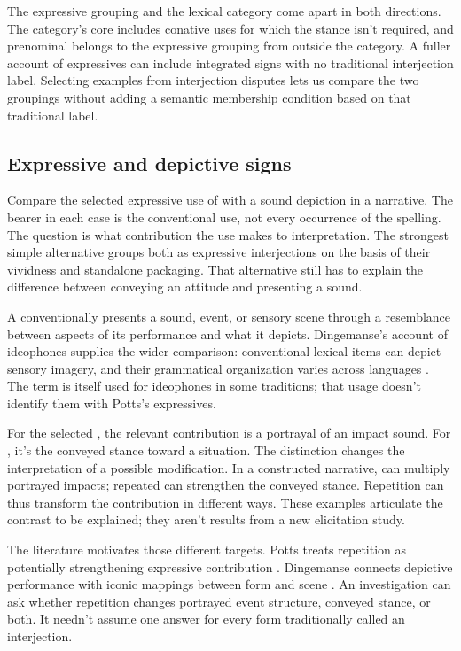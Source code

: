 \documentclass[12pt]{article}
\begin{document}
The expressive grouping and the lexical category come apart in both
directions. The category's core includes conative uses for which the stance
isn't required, and prenominal  belongs to the expressive
grouping from outside the category. A fuller account of expressives can include integrated signs
with no traditional interjection label. Selecting examples from interjection
disputes lets us compare the two groupings without adding a semantic
membership condition based on that traditional label.

\subsection{Expressive and depictive signs}\label{sec:expressive-depictive}

Compare the selected expressive use of  with a sound depiction
 in a narrative. The bearer in each case is the conventional
use, not every occurrence of the spelling. The question is what contribution
the use makes to interpretation. The strongest simple alternative groups
both as expressive interjections on the basis of their vividness and
standalone packaging. That alternative still has to explain the difference
between conveying an attitude and presenting a sound.

A  conventionally presents a sound, event, or sensory
scene through a resemblance between aspects of its performance and what
it depicts. Dingemanse's account of ideophones supplies the wider comparison:
conventional lexical items can depict sensory imagery, and their grammatical
organization varies across languages \citep[2--3]{dingemanse2018}.
The term  is itself used for ideophones in some traditions;
that usage doesn't identify them with Potts's expressives.

For the selected , the relevant contribution is a portrayal
of an impact sound. For , it's the conveyed stance toward
a situation. The distinction changes the interpretation of a possible
modification. In a constructed narrative,  can
multiply portrayed impacts; repeated  can strengthen the
conveyed stance. Repetition can thus transform the contribution in
different ways. These examples articulate the contrast to be explained;
they aren't results from a new elicitation study.

The literature motivates those different targets. Potts treats repetition
as potentially strengthening expressive contribution \citep[181--182]{potts2007}.
Dingemanse connects depictive performance with iconic mappings between
form and scene \citep[10--11]{dingemanse2018}. An investigation can
ask whether repetition changes portrayed event structure, conveyed stance,
or both. It needn't assume one answer for every form traditionally
called an interjection.
\end{document}
